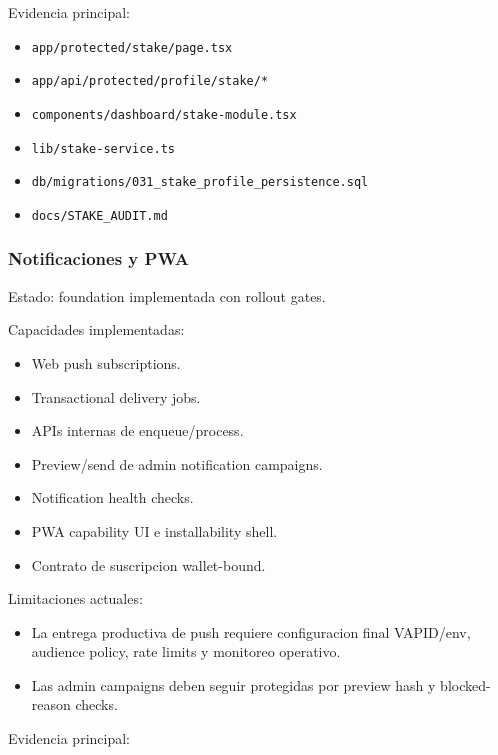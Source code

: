 \documentclass[
  10pt,
  letterpaper,
]{article}
\providecommand{\tightlist}{%
  \setlength{\itemsep}{0pt}\setlength{\parskip}{0pt}}
\let\oldtexttt\texttt
\renewcommand{\texttt}[1]{\oldtexttt{\small #1}}
\begin{document}
Evidencia principal:

\begin{itemize}
\tightlist
\item
  \texttt{app/protected/stake/page.tsx}
\item
  \texttt{app/api/protected/profile/stake/*}
\item
  \texttt{components/dashboard/stake-module.tsx}
\item
  \texttt{lib/stake-service.ts}
\item
  \texttt{db/migrations/031\_stake\_profile\_persistence.sql}
\item
  \texttt{docs/STAKE\_AUDIT.md}
\end{itemize}

\subsubsection{Notificaciones y PWA}\label{notificaciones-y-pwa}

Estado: foundation implementada con rollout gates.

Capacidades implementadas:

\begin{itemize}
\tightlist
\item
  Web push subscriptions.
\item
  Transactional delivery jobs.
\item
  APIs internas de enqueue/process.
\item
  Preview/send de admin notification campaigns.
\item
  Notification health checks.
\item
  PWA capability UI e installability shell.
\item
  Contrato de suscripcion wallet-bound.
\end{itemize}

Limitaciones actuales:

\begin{itemize}
\tightlist
\item
  La entrega productiva de push requiere configuracion final VAPID/env,
  audience policy, rate limits y monitoreo operativo.
\item
  Las admin campaigns deben seguir protegidas por preview hash y
  blocked-reason checks.
\end{itemize}

Evidencia principal:
\end{document}
